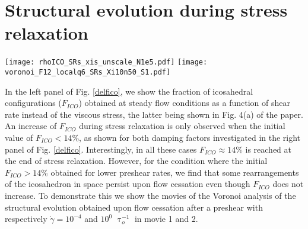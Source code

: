 \documentclass[aps,preprint,nofootinbib]{revtex4-1}
\begin{document}
\section{Structural evolution during stress relaxation}
\begin{figure*}[h!]
\texttt{[image: rhoICO\_SRs\_xis\_unscale\_N1e5.pdf]}
\texttt{[image: voronoi\_F12\_localq6\_SRs\_Xi10n50\_S1.pdf]}
\caption{\label{delfico} Left panel: Shear rate dependence of the fraction of icosahedral configurations obtained at steady flow conditions. This is the same data as that shown in the main graph of Fig. 4(a), here graphed without normalization. Right panel: Temporal evolution of $F_{ICO}$ upon flow cessation obtained for  $\zeta = 1$ and $5$  $\uptau_o \epsilon/a^2$. From top to bottom: the preshear rate is $\dot{\gamma} = 10^{-4}, 10^{-3}, 10^{-2}, 10^{-1}, 10^{0}$ $\uptau_o^{-1}$. The red and blue lines denote the data obtained for respectively $\zeta = 1$ and $5$  $\uptau_o \epsilon/a^2$.  The black horizontal line marks the magnitude of $F_{ICO}$ reached at the end of the stress relaxation process for the larger preshear conditions, for which we observe $F_{ICO}$ to evolve during stress relaxation.}
\end{figure*}
In the left panel of Fig. \ref{delfico}, we show the fraction of icosahedral configurations ($F_{ICO}$) obtained at steady flow conditions as a function of shear rate instead of the viscous stress, the latter being shown in Fig. 4(a) of the paper. An increase of $F_{ICO}$ during stress relaxation is only observed when the initial value of $F_{ICO} < 14 \%$, as shown for both damping factors investigated in the right panel of Fig. \ref{delfico}. Interestingly, in all these cases $F_{ICO} \approx 14 \%$ is reached at the end of stress relaxation. However, for the condition where the initial $F_{ICO} > 14 \%$ obtained for lower preshear rates, we find that some rearrangements of the icosahedron in space persist upon flow cessation even though $F_{ICO}$ does not increase. To demonstrate this we show the movies of the Voronoi analysis of the structural evolution obtained upon flow cessation after a preshear with respectively $\dot{\gamma} = 10^{-4}$ and $10^{0}$ $\uptau_o^{-1}$ in movie 1 and 2.
\end{document}

